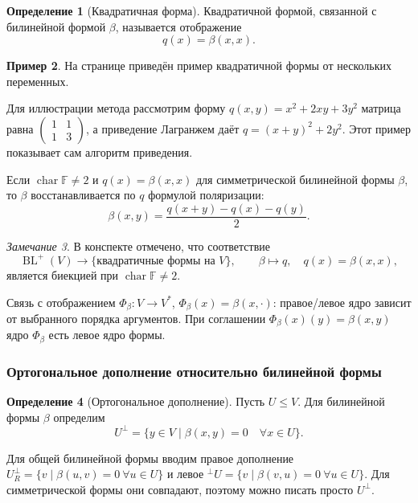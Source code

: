 \documentclass[12pt,a4paper]{article}
\theoremstyle{definition}
\newtheorem{definition}{Определение}[section]
\newtheorem{example}[definition]{Пример}
\theoremstyle{plain}
\theoremstyle{remark}
\newtheorem{remark}[definition]{Замечание}
\newenvironment{knowledgefix}{\begin{clarifybox}}{\end{clarifybox}}
\newcommand{\F}{\mathbb{F}}
\newcommand{\BL}{\operatorname{BL}}
\begin{document}
\begin{definition}[Квадратичная форма]
Квадратичной формой, связанной с билинейной формой $\beta$, называется отображение
\[
    q(x)=\beta(x,x).
\]
\end{definition}

\begin{example}
На странице приведён пример квадратичной формы от нескольких переменных.
\begin{knowledgefix}
Для иллюстрации метода рассмотрим форму \(q(x,y)=x^2+2xy+3y^2\) матрица равна \(\begin{pmatrix}1&1\\1&3\end{pmatrix}\), а приведение Лагранжем даёт \(q=(x+y)^2+2y^2\). Этот пример показывает сам алгоритм приведения.
\end{knowledgefix}
\end{example}

Если $\operatorname{char}\F\ne2$ и $q(x)=\beta(x,x)$ для симметрической билинейной формы $\beta$, то $\beta$ восстанавливается по $q$ формулой поляризации:
\[
    \beta(x,y)=\frac{q(x+y)-q(x)-q(y)}{2}.
\]

\begin{remark}
В конспекте отмечено, что соответствие
\[
    \BL^+(V)\longrightarrow \{\text{квадратичные формы на }V\},
    \qquad
    \beta\longmapsto q,\quad q(x)=\beta(x,x),
\]
является биекцией при $\operatorname{char}\F\ne2$.
\begin{knowledgefix}
Связь с отображением \(\Phi_\beta:V\to V^*\), \(\Phi_\beta(x)=\beta(x,\cdot)\): правое/левое ядро зависит от выбранного порядка аргументов. При соглашении \(\Phi_\beta(x)(y)=\beta(x,y)\) ядро \(\Phi_\beta\) есть левое ядро формы.
\end{knowledgefix}
\end{remark}

\subsubsection*{Ортогональное дополнение относительно билинейной формы}

\begin{definition}[Ортогональное дополнение]
Пусть $U\le V$. Для билинейной формы $\beta$ определим
\[
    U^\perp=\{y\in V\mid \beta(x,y)=0\quad \forall x\in U\}.
\]
\begin{knowledgefix}
Для общей билинейной формы вводим правое дополнение \(U^\perp_R=\{v\mid \beta(u,v)=0\ \forall u\in U\}\) и левое \({}^\perp U=\{v\mid \beta(v,u)=0\ \forall u\in U\}\). Для симметрической формы они совпадают, поэтому можно писать просто \(U^\perp\).
\end{knowledgefix}
\end{definition}
\end{document}
